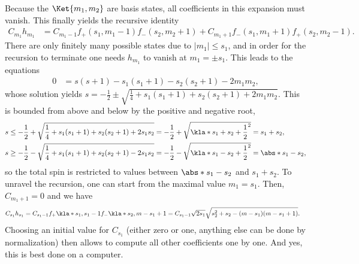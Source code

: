 \documentclass[english, parskip=full]{scrartcl}
\begin{document}
Because the $\Ket{m_1,m_2}$ are basis states, all coefficients in this expansion must vanish.
This finally yields the recursive identity
\begin{align}
C_{m_1} h_{m_1} &= C_{m_1-1} f_+(s_1,m_1-1) f_-(s_2,m_2+1) + C_{m_1+1} f_-(s_1,m_1+1) f_+(s_2,m_2-1).
\end{align}
There are only finitely many possible states due to $|m_1|\le s_1$, and in order for the recursion to terminate one needs $h_{m_1}$ to vanish at $m_1=\pm s_1$.
This leads to the equations
\begin{align}
0 &= s(s+1) - s_1(s_1+1) - s_2(s_2+1) - 2m_1m_2,
\end{align}
whose solution yields $s = -\frac{1}{2} \pm \sqrt{\frac{1}{4} + s_1(s_1+1) + s_2(s_2+1) + 2m_1m_2}$.
This is bounded from above and below by the positive and negative root,
\begin{align}
s&\le -\frac{1}{2} + \sqrt{\frac{1}{4} + s_1(s_1+1) + s_2(s_2+1) + 2s_1s_2} = -\frac{1}{2} + \sqrt{\kla*{s_1+s_2+\frac{1}{2}}^2} = s_1+s_2,\\
s&\ge -\frac{1}{2} - \sqrt{\frac{1}{4} + s_1(s_1+1) + s_2(s_2+1) - 2s_1s_2} = -\frac{1}{2} - \sqrt{\kla*{s_1-s_2+\frac{1}{2}}^2} = \abs*{s_1-s_2},
\end{align}
so the total spin is restricted to values between $\abs*{s_1-s_2}$ and $s_1+s_2$.
To unravel the recursion, one can start from the maximal value $m_1=s_1$.
Then, $C_{m_1+1} = 0$ and we have
\begin{align}
C_{s_1} h_{s_1} &= C_{s_1-1} f_+\kla*{s_1, s_1-1} f_-\kla*{s_2,m-s_1+1} = C_{s_1-1} \sqrt{2s_1} \sqrt{s_2^2+s_2 - (m-s_1)(m-s_1+1)}.
\end{align}
Choosing an initial value for $C_{s_1}$ (either zero or one, anything else can be done by normalization) then allows to compute all other coefficients one by one.
And yes, this is best done on a computer.
\end{document}
